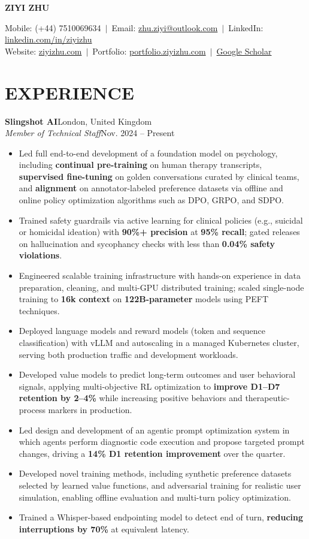 \documentclass[10pt,a4paper]{article}
\newcommand{\name}[1]{\begin{center}\textbf{\Large #1}\end{center}}
\newcommand{\contactinfo}[4]{
    \begin{center}
    Mobile: #1 $\,\vert\,$ Email: \href{mailto:#2}{#2} $\,\vert\,$ LinkedIn: \href{https://#3}{#3}\\
    Website: \href{https://#4}{#4} $\,\vert\,$ Portfolio: \href{https://portfolio.ziyizhu.com/}{portfolio.ziyizhu.com} $\,\vert\,$ \href{https://scholar.google.com/citations?user=wR-Ssa4AAAAJ}{Google Scholar}
    \end{center}
}
\newcommand{\experience}[4]{%
    \textbf{#1}\hfill #2\\
    \textit{#3}\hfill #4%
}
\begin{document}
\name{ZIYI ZHU}
\contactinfo{(+44) 7510069634}{zhu.ziyi@outlook.com}{linkedin.com/in/ziyizhu}{ziyizhu.com}

\section{EXPERIENCE}
\experience{Slingshot AI}{London, United Kingdom}
{Member of Technical Staff}{Nov. 2024 -- Present}
\begin{itemize}
    \item Led full end-to-end development of a foundation model on psychology, including \textbf{continual pre-training} on human therapy transcripts, \textbf{supervised fine-tuning} on golden conversations curated by clinical teams, and \textbf{alignment} on annotator-labeled preference datasets via offline and online policy optimization algorithms such as DPO, GRPO, and SDPO.
    \item Trained safety guardrails via active learning for clinical policies (e.g., suicidal or homicidal ideation) with \textbf{90\%+ precision} at \textbf{95\% recall}; gated releases on hallucination and sycophancy checks with less than \textbf{0.04\% safety violations}.
    \item Engineered scalable training infrastructure with hands-on experience in data preparation, cleaning, and multi-GPU distributed training; scaled single-node training to \textbf{16k context} on \textbf{122B-parameter} models using PEFT techniques.
    \item Deployed language models and reward models (token and sequence classification) with vLLM and autoscaling in a managed Kubernetes cluster, serving both production traffic and development workloads.
    \item Developed value models to predict long-term outcomes and user behavioral signals, applying multi-objective RL optimization to \textbf{improve D1--D7 retention by 2--4\%} while increasing positive behaviors and therapeutic-process markers in production.
    \item Led design and development of an agentic prompt optimization system in which agents perform diagnostic code execution and propose targeted prompt changes, driving a \textbf{14\% D1 retention improvement} over the quarter.
    \item Developed novel training methods, including synthetic preference datasets selected by learned value functions, and adversarial training for realistic user simulation, enabling offline evaluation and multi-turn policy optimization.
    \item Trained a Whisper-based endpointing model to detect end of turn, \textbf{reducing interruptions by 70\%} at equivalent latency.
\end{itemize}
\end{document}
